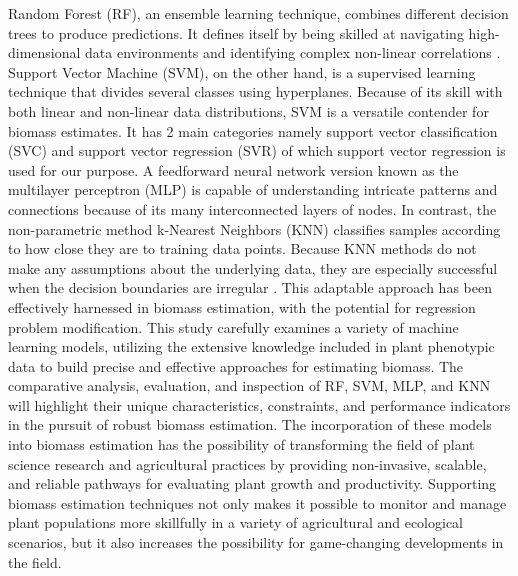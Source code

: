 \documentclass[a4paper,11pt]{report}%
\renewcommand{\\}{\vspace*{0.5\baselineskip} \newline}
\begin{document}
\noindent Random Forest (RF), an ensemble learning technique, combines different decision trees to produce predictions. It defines itself by being skilled at navigating high-dimensional data environments and identifying complex non-linear correlations \cite{4}. Support Vector Machine (SVM), on the other hand, is a supervised learning technique that divides several classes using hyperplanes. Because of its skill with both linear and non-linear data distributions, SVM is a versatile contender for biomass estimates. It has 2 main categories namely support vector classification (SVC) and support vector regression (SVR) \cite{5} of which support vector regression is used for our purpose. A feedforward neural network version known as the multilayer perceptron (MLP) is capable of understanding intricate patterns and connections because of its many interconnected layers of nodes\cite{6}. In contrast, the non-parametric method k-Nearest Neighbors (KNN) classifies samples according to how close they are to training data points. Because KNN methods do not make any assumptions about the underlying data, they are especially successful when the decision boundaries are irregular \cite{7}. This adaptable approach has been effectively harnessed in biomass estimation, with the potential for regression problem modification.
This study carefully examines a variety of machine learning models, utilizing the extensive knowledge included in plant phenotypic data to build precise and effective approaches for estimating biomass. The comparative analysis, evaluation, and inspection of RF, SVM, MLP, and KNN will highlight their unique characteristics, constraints, and performance indicators in the pursuit of robust biomass estimation. The incorporation of these models into biomass estimation has the possibility of transforming the field of plant science research and agricultural practices by providing non-invasive, scalable, and reliable pathways for evaluating plant growth and productivity. Supporting biomass estimation techniques not only makes it possible to monitor and manage plant populations more skillfully in a variety of agricultural and ecological scenarios, but it also increases the possibility for game-changing developments in the field.
\end{document}
